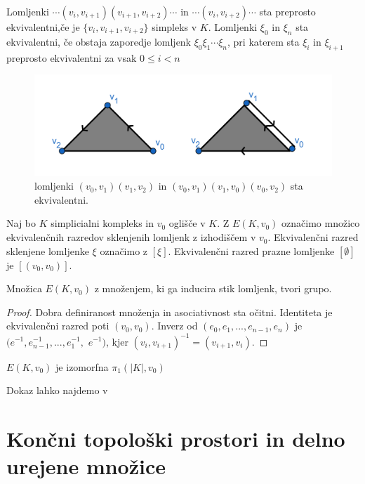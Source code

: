 \documentclass[mat1]{fmfdelo}
\begin{document}
Lomljenki $\cdots(v_i,v_{i+1})(v_{i+1},v_{i+2})\cdots$ in $\cdots(v_i,v_{i+2})\cdots$ sta preprosto ekvivalentni,če je $\{v_i,v_{i+1},v_{i+2}\}$ simpleks v $K$. Lomljenki $\xi_0$ in $\xi_n$ sta ekvivalentni, če obstaja zaporedje lomljenk $\xi_0\xi_1\cdots\xi_n$, pri katerem sta $\xi_i$ in $\xi_{i+1}$ preprosto ekvivalentni za vsak $0\leq i < n$


\begin{figure}[h]
    \centering
    \includegraphics[width=0.9\linewidth]{lomljenki2.png}
    \caption{lomljenki $(v_0,v_1)(v_1,v_2)$ in $(v_0,v_1)(v_1,v_0)(v_0,v_2)$ sta ekvivalentni.}
\end{figure}

    Naj bo $K$ simplicialni kompleks in $v_0$ oglišče v $K$. Z $E(K,v_0)$ označimo množico ekvivalenčnih razredov sklenjenih lomljenk z izhodiščem v $v_0$. Ekvivalenčni razred sklenjene lomljenke $\xi$ označimo z $[\xi]$. Ekvivalenčni razred prazne lomljenke $[\emptyset]$ je $[(v_0,v_0)]$.

    \begin{trditev}
        Množica $E(K,v_0)$ z množenjem, ki ga inducira stik lomljenk, tvori grupo.
    \end{trditev}
\begin{proof}
    Dobra definiranost množenja in asociativnost sta očitni. 
    Identiteta je ekvivalenčni razred poti $(v_0,v_0)$. Inverz 
    od $(e_0,e_1,...,e_{n-1},e_n)$ je $(e^{-1},e^{-1}_{n-1},...,e^{-1}_1,$ $e^{-1})$, kjer $(v_i,v_{i+1})^{-1}=(v_{i+1},v_i)$.
\end{proof}

\begin{izrek}
    \label{iz:grupa lomljenk}
$E(K,v_0)$ je izomorfna $\pi_1(|K|,v_0)$
\end{izrek}

Dokaz lahko najdemo v \cite{spanier1995algebraic}
\section{Končni topološki prostori in delno urejene množice}
\label{sec:delne}
\end{document}
